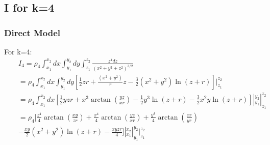 \documentclass{beamer}
\begin{document}
\subsection{I for k=4}
\begin{frame}
\frametitle{Direct Model}
For k=4:
\begin{eqnarray}
&&I_4 =  \rho_4 \int_{x_1}^{x_2}dx \int_{y_1}^{y_2} dy \int_{z_1}^{z_2} \frac{z^4 dz} {{(x^2 + y^2 + z^2)} ^{3/2}} \nonumber \\
&& = \rho_4 \int_{x_1}^{x_2}dx \int_{y_1}^{y_2} dy \left[ {\frac{1}{2}zr + \frac{(x^2+y^2)}{r}z - \frac{3}{2}(x^2+y^2)\ln{(z+r)}} \right]  |_{z_1}^{z_2} \nonumber \\  
&&= \rho_4 \int_{x_1}^{x_2}dx [{\frac{1}{2}yzr + x^3\arctan{\left(\frac{yz}{xr}\right)}  - \frac{1}{2}y^3 \ln{(z+r)} - \frac{3}{2}x^2 y \ln{(z+r)}}]|_{y_1}^{y_2}|_{z_1}^{z_2} \nonumber \\
&&= \rho_4 [ \frac{z^4}{4}\arctan{\left(\frac{xy}{zr}\right)}+\frac{x^4}{4}\arctan{\left(\frac{yz}{xr}\right)} + \frac{y^4}{4}\arctan{\left(\frac{zx}{yr}\right)} \nonumber \\
&& -\frac{xy}{2}(x^2+y^2)\ln{(z+r)} -\frac{xyzr}{4} ]|_{x_1}^{x_2}|_{y_1}^{y_2}|_{z_1}^{z_2} \nonumber \\
\label{i13}
\end{eqnarray}
\end{frame}
\end{document}
